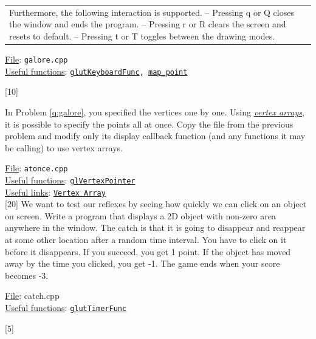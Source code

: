 \documentclass[addpoints]{exam}
\begin{document}
\begin{questions}
\begin{tabularx}{\linewidth}{lX}
    Furthermore, the following interaction is supported.\newline
    -- Pressing q or Q closes the window and ends the program.\newline
    -- Pressing r or R clears the screen and resets to default.\newline
    -- Pressing t or T toggles between the drawing modes.
  \end{tabularx}
  \underline{File}: {\tt galore.cpp}\\
  \underline{Useful functions}: {\tt \href{https://www.opengl.org/resources/libraries/glut/spec3/node49.html#SECTION00084000000000000000}{glutKeyboardFunc}, \hyperref[q:galore]{map\_point}}

  [10]

  In Problem \ref{q:galore}, you specified the vertices one by one. Using \href{http://www.informit.com/articles/article.aspx?p=1377833&seqNum=6}{\it vertex arrays}, it is possible to specify the points all at once. Copy the file from the previous problem and modify only its display callback function (and any functions it may be calling) to use vertex arrays.
  
  \noindent\underline{File}: {\tt atonce.cpp}\\
  \underline{Useful functions}: {\tt \href{https://www.khronos.org/registry/OpenGL-Refpages/gl2.1/xhtml/glVertexPointer.xml}{glVertexPointer}}\\
  \underline{Useful links}: {\tt \href{http://www.songho.ca/opengl/gl_vertexarray.html}{Vertex Array}}\\
  
  [20]
  We want to test our reflexes by seeing how quickly we can click on an object on screen. Write a program that displays a 2D object with non-zero area anywhere in the window. The catch is that it is going to disappear and reappear at some other location after a random time interval. You have to click on it before it disappears. If you succeed, you get 1 point. If the object has moved away by the time you clicked, you get -1. The game ends when your score becomes -3.

  \noindent\underline{File}: {catch.cpp}\\
  \underline{Useful functions}: {\tt \href{https://www.opengl.org/resources/libraries/glut/spec3/node64.html#SECTION000819000000000000000}{glutTimerFunc}}

  [5]
  \label{q:maxwell}
  

\end{questions}
\end{document}
